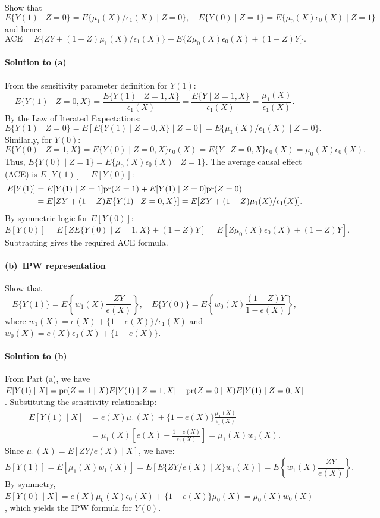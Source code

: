 \documentclass[krantz1]{krantz}
\def\pr{\textup{pr}}
\def\Paragraph{\paragraph}
\begin{document}
Show that
$$
E\{Y(1) \mid Z=0\} = E\{\mu_1(X)/\epsilon_1(X) \mid Z=0\}, \quad
E\{Y(0) \mid Z=1\} = E\{\mu_0(X)\epsilon_0(X) \mid Z=1\}
$$
and hence
$$
\mathrm{ACE} = E\{ZY + (1-Z)\mu_1(X)/\epsilon_1(X)\} - E\{Z\mu_0(X)\epsilon_0(X) + (1-Z)Y\}.
$$

\Paragraph{Solution to (a)}

From the sensitivity parameter definition for $Y(1)$:
\begin{equation*}
    E\{Y(1) \mid Z=0, X\} = \frac{E\{Y(1) \mid Z=1, X\}}{\epsilon_1(X)} = \frac{E\{Y \mid Z=1, X\}}{\epsilon_1(X)} = \frac{\mu_1(X)}{\epsilon_1(X)}.
\end{equation*}
By the Law of Iterated Expectations:
\begin{equation*}
    E\{Y(1) \mid Z=0\} = E[ E\{Y(1) \mid Z=0, X\} \mid Z=0 ] = E\{ \mu_1(X)/\epsilon_1(X) \mid Z=0 \}.
\end{equation*}
Similarly, for $Y(0)$:
\begin{equation*}
    E\{Y(0) \mid Z=1, X\} = E\{Y(0) \mid Z=0, X\} \epsilon_0(X) = E\{Y \mid Z=0, X\} \epsilon_0(X) = \mu_0(X)\epsilon_0(X).
\end{equation*}
Thus, $E\{Y(0) \mid Z=1\} = E\{ \mu_0(X)\epsilon_0(X) \mid Z=1 \}$.
The average causal effect (ACE) is $E[Y(1)] - E[Y(0)]$:
\begin{align*}
    E[Y(1)] &= E[Y(1) \mid Z=1] \pr(Z=1) + E[Y(1) \mid Z=0] \pr(Z=0) \\
    &= E[ ZY + (1-Z) E\{Y(1) \mid Z=0, X\} ] = E[ ZY + (1-Z) \mu_1(X)/\epsilon_1(X) ].
\end{align*}
By symmetric logic for $E[Y(0)]$:
\begin{equation*}
    E[Y(0)] = E[ Z E\{Y(0) \mid Z=1, X\} + (1-Z)Y ] = E[ Z \mu_0(X)\epsilon_0(X) + (1-Z)Y ].
\end{equation*}
Subtracting gives the required ACE formula.

 \Paragraph{(b)~IPW representation}\label{hw::sensitivity-ipw}

Show that
$$
E\{Y(1)\} = E\left\{w_1(X)\frac{ZY}{e(X)}\right\}, \quad
E\{Y(0)\} = E\left\{w_0(X)\frac{(1-Z)Y}{1-e(X)}\right\},
$$
where $w_1(X) = e(X) + \{1-e(X)\}/\epsilon_1(X)$ and $w_0(X) = e(X)\epsilon_0(X) + \{1-e(X)\}$.

\Paragraph{Solution to (b)}

From Part (a), we have $E[Y(1) \mid X] = \pr(Z=1 \mid X) E[Y(1) \mid Z=1, X] + \pr(Z=0 \mid X) E[Y(1) \mid Z=0, X]$.
Substituting the sensitivity relationship:
\begin{align*}
    E[Y(1) \mid X] &= e(X) \mu_1(X) + \{1-e(X)\} \frac{\mu_1(X)}{\epsilon_1(X)} \\
    &= \mu_1(X) \left[ e(X) + \frac{1-e(X)}{\epsilon_1(X)} \right] = \mu_1(X) w_1(X).
\end{align*}
Since $\mu_1(X) = E[ZY/e(X) \mid X]$, we have:
\begin{equation*}
    E[Y(1)] = E[ \mu_1(X) w_1(X) ] = E[ E\{ZY/e(X) \mid X\} w_1(X) ] = E\left\{ w_1(X) \frac{ZY}{e(X)} \right\}.
\end{equation*}
By symmetry, $E[Y(0) \mid X] = e(X) \mu_0(X)\epsilon_0(X) + \{1-e(X)\} \mu_0(X) = \mu_0(X) w_0(X)$, which yields the IPW formula for $Y(0)$.
\end{document}
